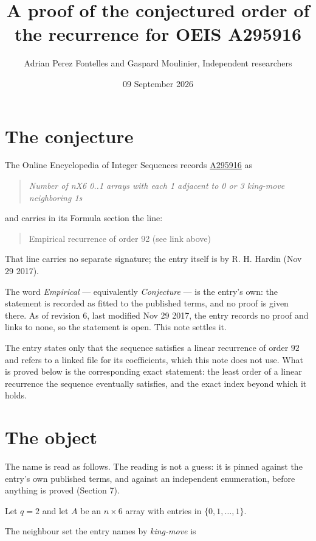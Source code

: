 \documentclass[11pt]{article}
\title{A proof of the conjectured order of the recurrence for OEIS A295916}
\author{Adrian Perez Fontelles and Gaspard Moulinier, Independent researchers}
\date{09 September 2026}
\theoremstyle{definition}
\begin{document}
\maketitle
\section{The conjecture}

The Online Encyclopedia of Integer Sequences records \href{https://oeis.org/A295916}{A295916} as

\begin{quote}\itshape Number of nX6 0..1 arrays with each 1 adjacent to 0 or 3 king-move neighboring 1s\end{quote}

and carries in its Formula section the line:

\begin{quote}\ttfamily Empirical recurrence of order 92 (see link above)\end{quote}

That line carries no separate signature; the entry itself is by R. H. Hardin (Nov 29 2017).

The word {\itshape Empirical} --- equivalently {\itshape Conjecture} --- is the entry's own: the statement is recorded as fitted to the published terms, and no proof is given there. As of revision 6, last modified Nov 29 2017, the entry records no proof and links to none, so the statement is open. This note settles it.

The entry states only that the sequence satisfies a linear recurrence of order $92$ and refers to a linked file for its coefficients, which this note does not use. What is proved below is the corresponding exact statement: the least order of a linear recurrence the sequence eventually satisfies, and the exact index beyond which it holds.

\section{The object}

The name is read as follows. The reading is not a guess: it is pinned against the entry's own published terms, and against an independent enumeration, before anything is proved (Section 7).

Let $q = 2$ and let $A$ be an $n \times 6$ array with entries in $\{0,1,\dots,1\}$.

The neighbour set the entry names by {\itshape king-move} is
\end{document}
